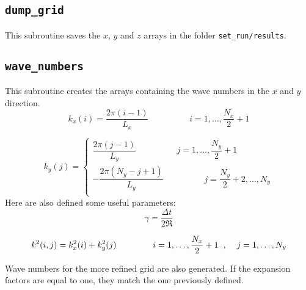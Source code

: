 \subsection{\texttt{dump\_grid}}
This subroutine saves the $x$, $y$ and $z$ arrays in the folder \texttt{set\_run/results}.

\subsection{\texttt{wave\_numbers}}
This subroutine creates the arrays containing the wave numbers in the $x$ and $y$ direction.
\[
k_x(i)=\frac{2\pi(i-1)}{L_x} \hspace{2cm} i=1,\dots,\frac{N_x}{2}+1
\]

\[
k_y(j)=
\begin{cases}
\dfrac{2\pi(j-1)}{L_y} \hspace{2cm} j=1,\dots,\dfrac{N_y}{2}+1\\[3ex]
-\dfrac{2\pi(N_y-j+1)}{L_y} \hspace{2cm} j=\dfrac{N_y}{2}+2,\dots,N_y\\
\end{cases}
\]
Here are also defined some useful parameters:
\[
\gamma=\frac{\Delta t}{2\Re}
\]

\[
k^2(i,j)=k_x^2(i)+k_y^2(j) \hspace{1.5cm} i=1,\dots,\frac{N_x}{2}+1 \hspace{0.2cm},\hspace{0.4cm}  j=1,\dots,N_y
\]

Wave numbers for the more refined grid are also generated.
If the expansion factors are equal to one, they match the one previously defined.


